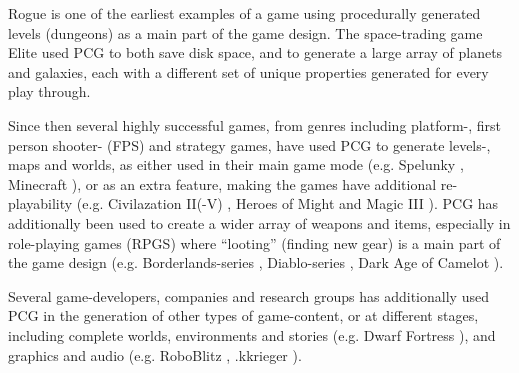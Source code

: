 \documentclass[a4paper,titlepage,final]{report}
\begin{document}
Rogue \citep{game:rogue} is one of the earliest examples of a game using procedurally generated levels (dungeons) as a main part of the game design.
The space-trading game Elite \citep{game:elite} used PCG to both save disk space, and to generate a large array of planets and galaxies, each with a different set of unique properties generated for every play through. 

Since then several highly successful games, from genres including platform-, first person shooter- (FPS) and strategy games, have used PCG to generate levels-, maps and worlds, as either used in their main game mode (e.g. Spelunky \citep{game:spelunky}, Minecraft \citep{game:minecraft}), or as an extra feature, making the games have additional re-playability (e.g. Civilazation II(-V) \citep{game:civilizationii}, Heroes of Might and Magic III \citep{game:homm3}).
PCG has additionally been used to create a wider array of weapons and items, especially in role-playing games (RPGS) where ``looting'' (finding new gear) is a main part of the game design (e.g. Borderlands-series \citep{game:borderlandsseries}, Diablo-series \citep{game:diabloseries}, Dark Age of Camelot \citep{game:darkage}).

Several game-developers, companies and research groups has additionally used PCG in the generation of other types of game-content, or at different stages, including complete worlds, environments and stories (e.g. Dwarf Fortress \citep{game:dwarffortress}), and graphics and audio (e.g. RoboBlitz \citep{game:roboblitz}, .kkrieger \citep{game:kkrieger}).



\end{document}
